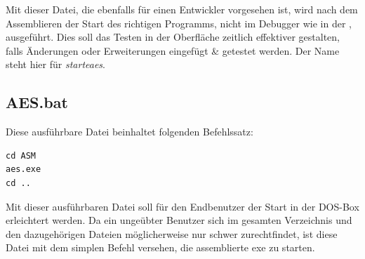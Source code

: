 Mit dieser Datei, die ebenfalls für einen Entwickler vorgesehen ist, wird nach dem Assemblieren der Start des richtigen Programms, nicht im Debugger wie in der , ausgeführt. Dies soll das Testen in der Oberfläche zeitlich effektiver gestalten, falls Änderungen oder Erweiterungen eingefügt \& getestet werden. Der Name steht hier für \emph{starteaes}.

\subsection{AES.bat}
Diese ausführbare Datei beinhaltet folgenden Befehlssatz:

\begin{lstlisting}[language={},caption={\texttt{AES.bat}},label={lst:aesbat}]
cd ASM
aes.exe
cd ..
\end{lstlisting}

Mit dieser ausführbaren Datei soll für den Endbenutzer der Start in der DOS-Box erleichtert werden. Da ein ungeübter Benutzer sich im gesamten Verzeichnis und den dazugehörigen Dateien möglicherweise nur schwer zurechtfindet, ist diese Datei mit dem simplen Befehl versehen, die assemblierte exe zu starten.
